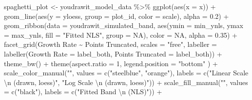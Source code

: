 \documentclass[print]{nuthesis}
\newenvironment{Shaded}{\begin{snugshade}}{\end{snugshade}}
\newcommand{\AttributeTok}[1]{\textcolor[rgb]{0.77,0.63,0.00}{#1}}
\newcommand{\ConstantTok}[1]{\textcolor[rgb]{0.00,0.00,0.00}{#1}}
\newcommand{\DecValTok}[1]{\textcolor[rgb]{0.00,0.00,0.81}{#1}}
\newcommand{\FloatTok}[1]{\textcolor[rgb]{0.00,0.00,0.81}{#1}}
\newcommand{\FunctionTok}[1]{\textcolor[rgb]{0.00,0.00,0.00}{#1}}
\newcommand{\NormalTok}[1]{#1}
\newcommand{\OtherTok}[1]{\textcolor[rgb]{0.56,0.35,0.01}{#1}}
\newcommand{\SpecialCharTok}[1]{\textcolor[rgb]{0.00,0.00,0.00}{#1}}
\newcommand{\StringTok}[1]{\textcolor[rgb]{0.31,0.60,0.02}{#1}}
\begin{document}
\begin{Shaded}
\begin{Highlighting}[]
\NormalTok{spaghetti\_plot }\OtherTok{\textless{}{-}}\NormalTok{ youdrawit\_model\_data }\SpecialCharTok{\%\textgreater{}\%}
  \FunctionTok{ggplot}\NormalTok{(}\FunctionTok{aes}\NormalTok{(}\AttributeTok{x =}\NormalTok{ x)) }\SpecialCharTok{+}
  \FunctionTok{geom\_line}\NormalTok{(}\FunctionTok{aes}\NormalTok{(}\AttributeTok{y =}\NormalTok{ yloess, }\AttributeTok{group =}\NormalTok{ plot\_id, }\AttributeTok{color =}\NormalTok{ scale), }\AttributeTok{alpha =} \FloatTok{0.2}\NormalTok{) }\SpecialCharTok{+}
  \FunctionTok{geom\_ribbon}\NormalTok{(}\AttributeTok{data =}\NormalTok{ youdrawit\_simulated\_band, }\FunctionTok{aes}\NormalTok{(}\AttributeTok{ymin =}\NormalTok{ min\_ynls, }\AttributeTok{ymax =}\NormalTok{ max\_ynls, }\AttributeTok{fill =} \StringTok{"Fitted NLS"}\NormalTok{, }\AttributeTok{group =} \ConstantTok{NA}\NormalTok{), }\AttributeTok{color =} \ConstantTok{NA}\NormalTok{, }\AttributeTok{alpha =} \FloatTok{0.35}\NormalTok{) }\SpecialCharTok{+}
  \FunctionTok{facet\_grid}\NormalTok{(}\StringTok{\textasciigrave{}}\AttributeTok{Growth Rate}\StringTok{\textasciigrave{}} \SpecialCharTok{\textasciitilde{}} \StringTok{\textasciigrave{}}\AttributeTok{Points Truncated}\StringTok{\textasciigrave{}}\NormalTok{, }\AttributeTok{scales =} \StringTok{"free"}\NormalTok{, }\AttributeTok{labeller =} \FunctionTok{labeller}\NormalTok{(}\StringTok{\textasciigrave{}}\AttributeTok{Growth Rate}\StringTok{\textasciigrave{}} \OtherTok{=}\NormalTok{ label\_both, }\StringTok{\textasciigrave{}}\AttributeTok{Points Truncated}\StringTok{\textasciigrave{}} \OtherTok{=}\NormalTok{ label\_both)) }\SpecialCharTok{+}
  \FunctionTok{theme\_bw}\NormalTok{() }\SpecialCharTok{+}
  \FunctionTok{theme}\NormalTok{(}\AttributeTok{aspect.ratio =} \DecValTok{1}\NormalTok{,}
        \AttributeTok{legend.position =} \StringTok{"bottom"}
\NormalTok{        ) }\SpecialCharTok{+}
  \FunctionTok{scale\_color\_manual}\NormalTok{(}\StringTok{""}\NormalTok{, }\AttributeTok{values =} \FunctionTok{c}\NormalTok{(}\StringTok{"steelblue"}\NormalTok{, }\StringTok{"orange"}\NormalTok{), }\AttributeTok{labels =} \FunctionTok{c}\NormalTok{(}\StringTok{"Linear Scale }\SpecialCharTok{\textbackslash{}n}\StringTok{ (drawn, loess)"}\NormalTok{, }\StringTok{"Log Scale }\SpecialCharTok{\textbackslash{}n}\StringTok{ (drawn, loess)"}\NormalTok{)) }\SpecialCharTok{+}
  \FunctionTok{scale\_fill\_manual}\NormalTok{(}\StringTok{""}\NormalTok{, }\AttributeTok{values =} \FunctionTok{c}\NormalTok{(}\StringTok{"black"}\NormalTok{), }\AttributeTok{labels =} \FunctionTok{c}\NormalTok{(}\StringTok{"Fitted Band }\SpecialCharTok{\textbackslash{}n}\StringTok{ (NLS)"}\NormalTok{)) }\SpecialCharTok{+}

\end{Highlighting}
\end{Shaded}
\end{document}
